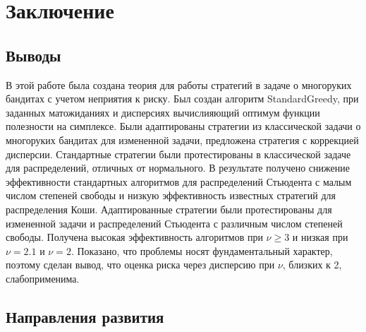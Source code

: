 
\chapter{Заключение} %

\label{Future} %


\section{Выводы}

В этой работе была создана теория для работы стратегий в задаче о многоруких бандитах с учетом неприятия к риску. Был создан алгоритм StandardGreedy, при заданных матожиданиях и дисперсиях вычислияющий оптимум функции полезности на симплексе. Были адаптированы стратегии из классической задачи о многоруких бандитах для измененной задачи, предложена стратегия с коррекцией дисперсии. Стандартные стратегии были протестированы в классической задаче для распределений, отличных от нормального. В результате получено снижение эффективности стандартных алгоритмов для распределений Стьюдента с малым числом степеней свободы и низкую эффективность известных стратегий для распределения Коши. Адаптированные стратегии были протестированы для измененной задачи и распределений Стьюдента с различным числом степеней свободы. Получена высокая эффективность алгоритмов при $\nu \geq 3$ и низкая при $\nu = 2.1$ и $\nu = 2$. Показано, что проблемы носят фундаментальный характер, поэтому сделан вывод, что оценка риска через дисперсию при $\nu$, близких к 2, слабоприменима.


\section{Направления развития}


